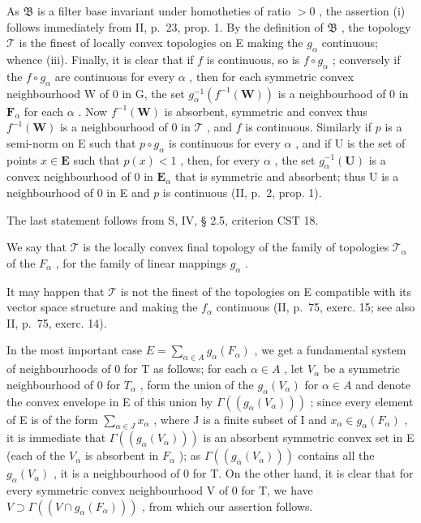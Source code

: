 As \(\mathfrak{B}\) is a filter base invariant under homotheties of ratio \(>0\) , the assertion (i) follows immediately from II, p.~23, prop. 1. By the definition of \(\mathfrak{B}\) , the topology \(\mathcal{T}\) is the finest of locally convex topologies on E making the \(g_{\alpha}\) continuous; whence (iii). Finally, it is clear that if \(f\) is continuous, so is \(f \circ g_{\alpha}\) ; conversely if the \(f \circ g_{\alpha}\) are continuous for every \(\alpha\) , then for each symmetric convex neighbourhood W of 0 in G, the set \(g_{\alpha}^{-1}(f^{-1}(\mathbf{W}))\) is a neighbourhood of 0 in \(\mathbf{F}_{\alpha}\) for each \(\alpha\) . Now \(f^{-1}(\mathbf{W})\) is absorbent, symmetric and convex thus \(f^{-1}(\mathbf{W})\) is a neighbourhood of 0 in \(\mathcal{T}\) , and \(f\) is continuous. Similarly if \(p\) is a semi-norm on E such that \(p \circ g_{\alpha}\) is continuous for every \(\alpha\) , and if U is the set of points \(x \in \mathbf{E}\) such that \(p(x) < 1\) , then, for every \(\alpha\) , the set \(g_{\alpha}^{-1}(\mathbf{U})\) is a convex neighbourhood of 0 in \(\mathbf{E}_{\alpha}\) that is symmetric and absorbent; thus U is a neighbourhood of 0 in E and \(p\) is continuous (II, p.~2, prop. 1).

The last statement follows from S, IV, § 2.5, criterion CST 18.

We say that \(\mathcal{T}\) is the locally convex final topology of the family of topologies \(\mathcal{T}_{\alpha}\) of the \(F_{\alpha}\) , for the family of linear mappings \(g_{\alpha}\) .

It may happen that \(\mathcal{T}\) is not the finest of the topologies on E compatible with its vector space structure and making the \(f_{\alpha}\) continuous (II, p.~75, exerc. 15; see also II, p.~75, exerc. 14).

In the most important case \(E = \sum_{\alpha \in A} g_{\alpha}(F_{\alpha})\) , we get a fundamental system of neighbourhoods of 0 for T as follows; for each \(\alpha \in A\) , let \(V_{\alpha}\) be a symmetric neighbourhood of 0 for \(T_{\alpha}\) , form the union of the \(g_{\alpha}(V_{\alpha})\) for \(\alpha \in A\) and denote the convex envelope in E of this union by \(\Gamma((g_{\alpha}(V_{\alpha})))\) ; since every element of E is of the form \(\sum_{\alpha \in J} x_{\alpha}\) , where J is a finite subset of I and \(x_{\alpha} \in g_{\alpha}(F_{\alpha})\) , it is immediate that \(\Gamma((g_{\alpha}(V_{\alpha})))\) is an absorbent symmetric convex set in E (each of the \(V_{\alpha}\) is absorbent in \(F_{\alpha}\) ); as \(\Gamma((g_{\alpha}(V_{\alpha})))\) contains all the \(g_{\alpha}(V_{\alpha})\) , it is a neighbourhood of 0 for T. On the other hand, it is clear that for every symmetric convex neighbourhood V of 0 for T, we have \(V \supset \Gamma((V \cap g_{\alpha}(F_{\alpha})))\) , from which our assertion follows.

